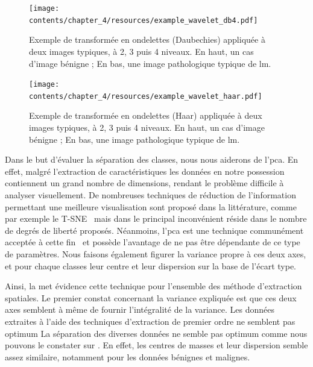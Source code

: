 \begin{figure}[H]
    \centering
    \texttt{[image: contents/chapter\_4/resources/example\_wavelet\_db4.pdf]}
    \caption{Exemple de transformée en ondelettes (Daubechies) appliquée à deux images typiques, à 2, 3 puis 4 niveaux. En haut, un cas d'image bénigne ; En bas, une image pathologique typique de \gls{lm}.}
    \label{fig:example_wavelet_db4}
\end{figure}\par

\begin{figure}[H]
    \centering
    \texttt{[image: contents/chapter\_4/resources/example\_wavelet\_haar.pdf]}
    \caption{Exemple de transformée en ondelettes (Haar) appliquée à deux images typiques, à 2, 3 puis 4 niveaux. En haut, un cas d'image bénigne ; En bas, une image pathologique typique de \gls{lm}.}
    \label{fig:example_wavelet_haar}
\end{figure}\par

Dans le but d'évaluer la séparation des classes, nous nous aiderons de l'\gls{pca}. En effet, malgré l'extraction de caractéristiques les données en notre possession contiennent un grand nombre de dimensions, rendant le problème difficile à analyser visuellement. De nombreuses techniques de réduction de l'information permettant une meilleure visualisation sont proposé dans la littérature, comme par exemple le T-SNE~\cite{Maaten2008} mais dans le principal inconvénient réside dans le nombre de degrés de liberté proposés. Néanmoins, l'\gls{pca} est une technique communément acceptée à cette fin~\cite{Himberg2001} et possède l'avantage de ne pas être dépendante de ce type de paramètres. Nous faisons également figurer la variance propre à ces deux axes, et pour chaque classes leur centre et leur dispersion sur la base de l'écart type.\par

Ainsi, la  met évidence cette technique pour l'ensemble des méthode d'extraction spatiales. Le premier constat concernant la variance expliquée est que ces deux axes semblent à même de fournir l'intégralité de la variance. Les données extraites à l'aide des techniques d'extraction de premier ordre ne semblent pas optimum
La séparation des diverses données ne semble pas optimum comme nous pouvons le constater sur . En effet, les centres de masses et leur dispersion semble assez similaire, notamment pour les données bénignes et malignes.\par

